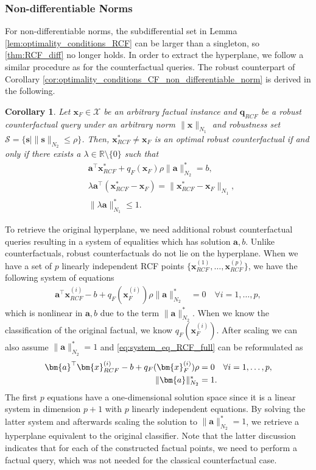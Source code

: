\documentclass{article}
\newtheorem{corollary}[theorem]{Corollary}
\begin{document}
\subsubsection{Non-differentiable Norms}
For non-differentiable norms, the subdifferential set in Lemma \ref{lem:optimality_conditions_RCF} can be larger than a singleton, so \cref{thm:RCF_diff} no longer holds. In order to extract the hyperplane, we follow a similar procedure as for the counterfactual queries. The robust counterpart of Corollary \ref{cor:optimality_conditions_CF_non_differentiable_norm} is derived in the following.
\begin{corollary}\label{cor:optimality_conditions_RCF_non_differentiable_norm}
Let $\bm{x}_F\in \mathcal X$ be an arbitrary factual instance and $\bm{q}_{RCF}$ be a robust counterfactual query under an arbitrary norm $\| \bm{x} \|_{N_1}$ and robustness set $\mathcal S=\{ \bm{s}\mid \|\bm{s}\|_{N_2}\le \rho\}$. Then, $\bm{x}_{RCF}^*\neq \bm{x}_F$ is an optimal robust counterfactual if and only if there exists a $\lambda\in\mathbb R\setminus \{ 0\}$ such that
\begin{align*}
    &\bm{a}^\top \bm{x}_{RCF}^* + q_F(\bm{x}_F)\rho \|\bm{a}\|_{N_2}^* = b, \\
    &  \lambda \bm{a}^\top (\bm{x}_{RCF}^* - \bm{x}_F) = \|\bm{x}_{RCF}^* - \bm{x}_F\|_{N_1}, \\
    & \|\lambda \bm{a} \|_{N_1}^* \le 1.
\end{align*}
\end{corollary}

To retrieve the original hyperplane, we need additional robust counterfactual queries resulting in a system of equalities which has solution $\bm{a},b$. Unlike counterfactuals, robust counterfactuals do not lie on the hyperplane. When we have a set of $p$ linearly independent RCF points $\{\bm{x}^{(1)}_{RCF}, \hdots, \bm{x}^{(p)}_{RCF}\}$, we have the following system of equations
\begin{align}\label{eq:system_eq_RCF_full}
\bm{a}^\top \bm{x}^{(i)}_{RCF} - b+ q_F(\bm{x}^{(i)}_F)\rho\|\bm{a}\|_{N_2}^* & = 0 \quad  \forall i=1,\hdots, p,    
\end{align}
which is nonlinear in $\bm{a},b$ due to the term $\|\bm{a}\|_{N_2}^*$. When we know the classification of the original factual, we know $q_F(\bm{x}^{(i)}_F)$. After scaling we can also assume $\|\bm{a}\|_{N_2}^*=1$ and \eqref{eq:system_eq_RCF_full} can be reformulated as
\begin{align}\label{eq:system_eq_RCF}
\bm{a}^\top \bm{x}^{(i)}_{RCF} - b+ q_F(\bm{x}^{(i)}_F)\rho & = 0 \quad \forall i=1,\hdots, p, \\
\| \bm{a}\|^*_{N_2} & = 1.\notag
\end{align}
The first $p$ equations have a one-dimensional solution space since it is a linear system in dimension $p+1$ with $p$ linearly independent equations. By solving the latter system and afterwards scaling the solution to $\|\bm{a}\|_{N_2}^*=1$, we retrieve a hyperplane equivalent to the original classifier. Note that the latter discussion indicates that for each of the constructed factual points, we need to perform a factual query, which was not needed for the classical counterfactual case.
\end{document}
